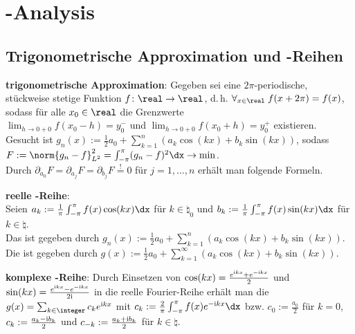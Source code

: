 \section{%
    -Analysis%
}

\subsection{%
    Trigonometrische Approximation und -Reihen%
}

\textbf{trigonometrische Approximation}:
Gegeben sei eine $2\pi$-periodische, stückweise stetige Funktion $f\colon \real \to \real$, d.\,h.
$\forall_{x \in \real}\; f(x + 2\pi) = f(x)$, sodass für alle $x_0 \in \real$ die Grenzwerte\\
$\lim_{h \to 0+0} f(x_0 - h) = y_0^-$ und $\lim_{h \to 0+0} f(x_0 + h) = y_0^+$ existieren.\\
Gesucht ist $g_n(x) := \frac{1}{2} a_0 + \sum_{k=1}^n (a_k\cos(kx) + b_k\sin(kx))$, sodass\\
$F := \norm{g_n - f}_{L^2}^2 = \int_{-\pi}^\pi (g_n - f)^2 \dx \to \min$.\\
Durch $\partial_{a_0} F = \partial_{a_j} F = \partial_{b_j} F \overset{!}{=} 0$ für
$j = 1, \dotsc, n$ erhält man folgende Formeln.

\linie

\textbf{reelle -Reihe}:\\
Seien $a_k := \frac{1}{\pi} \int_{-\pi}^\pi f(x)\cos(kx) \dx$ für $k \in \natural_0$
und $b_k := \frac{1}{\pi} \int_{-\pi}^\pi f(x)\sin(kx) \dx$ für $k \in \natural$.\\
Das  ist gegeben durch
$g_n(x) := \frac{1}{2} a_0 + \sum_{k=1}^n (a_k\cos(kx) + b_k\sin(kx))$.\\
Die  ist gegeben durch
$g(x) := \frac{1}{2} a_0 + \sum_{k=1}^\infty (a_k\cos(kx) + b_k\sin(kx))$.

\textbf{komplexe -Reihe}:
Durch Einsetzen von $\cos(kx) = \frac{e^{\text{i} kx} + e^{-\text{i} kx}}{2}$ und
$\sin(kx) = \frac{e^{\text{i} kx} - e^{-\text{i} kx}}{2\text{i}}$ in die reelle Fourier-Reihe erhält man
die  $g(x) = \sum_{k\in\integer} c_k e^{\iu kx}$
mit $c_k := \frac{2}{\pi} \int_{-\pi}^\pi f(x) e^{-\iu kx} \dx$ bzw.
$c_0 := \frac{a_0}{2}$ für $k = 0$,
$c_k := \frac{a_k - \text{i} b_k}{2}$ und $c_{-k} := \frac{a_k + \text{i} b_k}{2}$ für $k \in \natural$.

\linie

